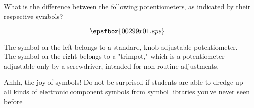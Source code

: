 

What is the difference between the following potentiometers, as indicated by their respective symbols?

$$\epsfbox{00299x01.eps}$$







The symbol on the left belongs to a standard, knob-adjustable potentiometer.  The symbol on the right belongs to a "trimpot," which is a potentiometer adjustable only by a screwdriver, intended for non-routine adjustments.







Ahhh, the joy of symbols!  Do not be surprised if students are able to dredge up all kinds of electronic component symbols from symbol libraries you've never seen before.




